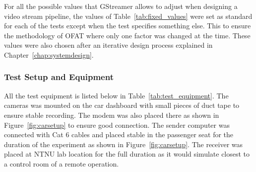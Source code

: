 

For all the possible values that GStreamer allows to adjust when designing a video stream pipeline, the values of Table~\ref{tab:fixed_values} were set as standard for each of the tests except when the test specifies something else. This to ensure the methodology of OFAT where only one factor was changed at the time. These values were also chosen after an iterative design process explained in Chapter~\ref{chap:systemdesign}.



\subsubsection{Test Setup and Equipment}

All the test equipment is listed below in Table~\ref{tab:test_equipment}. The cameras was mounted on the car dashboard with small pieces of duct tape to ensure stable recording. The modem was also placed there as shown in Figure~\ref{fig:carsetup} to ensure good connection. The sender computer was connected with Cat 6 cables and placed stable in the passenger seat for the duration of the experiment as shown in Figure~\ref{fig:carsetup}. The receiver was placed at NTNU lab location for the full duration as it would simulate closest to a control room of a remote operation.



